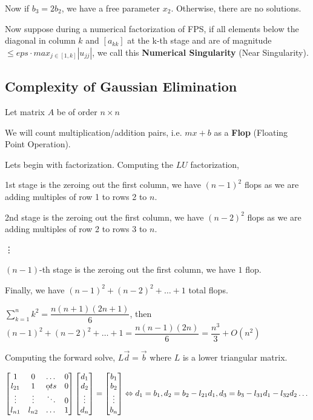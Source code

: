 \documentclass{article}
\begin{document}
\vspace{0.2cm}

Now if $b_3 = 2b_2$, we have a free parameter $x_2$. Otherwise, there are no solutions. 

Now suppose during a numerical factorization of FPS, if all elements below the diagonal in column $k$ and $[a_{kk}]$ at the k-th stage and are of magnitude $\leq eps \cdot max_{j \in [1, k]} |u_{jj}|$, we call this \textbf{Numerical Singularity} (Near Singularity).

\subsection{Complexity of Gaussian Elimination}

Let matrix $A$ be of order $n \times n$

\vspace{0.2cm}

We will count multiplication/addition pairs, i.e. $m x + b$ as a \textbf{Flop} (Floating Point Operation).

Lets begin with factorization. Computing the $LU$ factorization,

\vspace{0.2cm}

1st stage is the zeroing out the first column, we have $(n - 1)^2$ flops as we are adding multiples of row 1 to rows 2 to $n$.

2nd stage is the zeroing out the first column, we have $(n - 2)^2$ flops as we are adding multiples of row 2 to rows 3 to $n$.

\vdots

$(n - 1)$-th stage is the zeroing out the first column, we have $1$ flop.

Finally, we have $(n - 1)^2 + (n - 2)^2 + \dots + 1$ total flops.

$\displaystyle \sum_{k = 1}^n k^2 = \dfrac{n(n + 1)(2n + 1)}{6}$, then $(n - 1)^2 + (n - 2)^2 + \dots + 1 = \dfrac{n(n - 1)(2n)}{6} = \dfrac{n^3}{3} + O(n^2)$

\vspace{0.2cm}

Computing the forward solve, $L\vec{d} = \vec{b}$ where $L$ is a lower triangular matrix.

$\begin{bmatrix}
1 & 0 & \dots & 0\\
l_{21} & 1 & \d ots & 0\\
\vdots & \vdots & \ddots & 0\\
l_{n1} & l_{n2} & \dots & 1
\end{bmatrix}\begin{bmatrix}
d_1\\
d_2\\
\vdots\\
d_n
\end{bmatrix} = \begin{bmatrix}
b_1\\
b_2\\
\vdots\\
b_n
\end{bmatrix} \Leftrightarrow d_1 = b_1, d_2 = b_2 - l_{21}d_1, d_3 = b_3 - l_{31} d_1 - l_{32}d_2 \dots$
\end{document}
